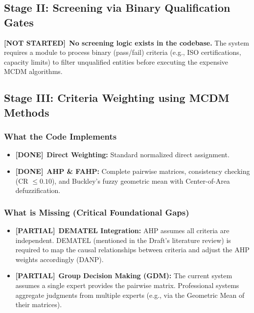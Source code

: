 \documentclass[11pt]{article}
\newcommand{\done}{\textcolor{done}{\textbf{[DONE]}}}
\newcommand{\partial}{\textcolor{partial}{\textbf{[PARTIAL]}}}
\newcommand{\notdone}{\textcolor{notdone}{\textbf{[NOT STARTED]}}}
\begin{document}
\subsection{Stage II: Screening via Binary Qualification Gates}
\label{sec:stage2}
\notdone\ \textbf{No screening logic exists in the codebase.} 
The system requires a module to process binary (pass/fail) criteria (e.g., ISO certifications, capacity limits) to filter unqualified entities before executing the expensive MCDM algorithms.

\subsection{Stage III: Criteria Weighting using MCDM Methods}
\label{sec:stage3}

\subsubsection{What the Code Implements}
\begin{itemize}
    \item \done\ \textbf{Direct Weighting:} Standard normalized direct assignment.
    \item \done\ \textbf{AHP \& FAHP:} Complete pairwise matrices, consistency checking (CR $\leq 0.10$), and Buckley's fuzzy geometric mean with Center-of-Area defuzzification.
\end{itemize}

\subsubsection{What is Missing (Critical Foundational Gaps)}
\begin{itemize}
    \item \partial\ \textbf{DEMATEL Integration:} AHP assumes all criteria are independent. DEMATEL (mentioned in the Draft's literature review) is required to map the causal relationships between criteria and adjust the AHP weights accordingly (DANP).
    \item \partial\ \textbf{Group Decision Making (GDM):} The current system assumes a single expert provides the pairwise matrix. Professional systems aggregate judgments from multiple experts (e.g., via the Geometric Mean of their matrices).
\end{itemize}
\end{document}
